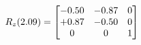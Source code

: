 \documentclass[preview]{standalone}
\begin{document}
\begin{align*}
\special{dvisvgm:raw <g id='unique000'>}R_{z}(2.09) = \begin{bmatrix}-0.50 & -0.87 & 0 \\+0.87 & -0.50 & 0 \\0 & 0 & 1\end{bmatrix}\special{dvisvgm:raw </g>}
\end{align*}
\end{document}

